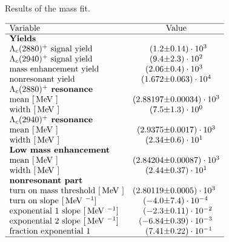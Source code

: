  
\begin{table}[h]
    \centering
    \caption{Results of the \Dz\proton mass fit.}
    \label{tab:fit_mD0p_RS}
    $\begin{array}{lr@{\pm}l}
    \hline
    \text{Variable} & \multicolumn{2}{c}{\text{Value}} \\
    \hline
        \multicolumn{3}{l}{\text{\textbf{Yields}}} \\
\text{\LcResI signal yield}&(1.2 & 0.14) \cdot 10^{3}\\
\text{\LcResII signal yield}&(9.4 & 2.3) \cdot 10^{2}\\
\text{mass enhancement yield}&(2.06 & 0.4) \cdot 10^{3}\\
\text{nonresonant yield}&(1.672 & 0.063) \cdot 10^{4}\\
\multicolumn{3}{l}{\text{\textbf{\LcResI resonance}}} \\
\text{mean [\mev]}&(2.88197 & 0.00034) \cdot 10^{3}\\
\text{width [\mev]}&(7.5 & 1.3) \cdot 10^{0}\\
\multicolumn{3}{l}{\text{\textbf{\LcResII resonance}}} \\
\text{mean [\mev]}&(2.9375 & 0.0017) \cdot 10^{3}\\
\text{width [\mev]}&(2.34 & 0.6) \cdot 10^{1}\\
\multicolumn{3}{l}{\text{\textbf{Low mass enhancement}}} \\
\text{mean [\mev]}&(2.84204 & 0.00087) \cdot 10^{3}\\
\text{width [\mev]}&(2.44 & 0.37) \cdot 10^{1}\\
\multicolumn{3}{l}{\text{\textbf{nonresonant part}}} \\
\text{turn on mass threshold [\mev]}&(2.80119 & 0.0005) \cdot 10^{3}\\
\text{turn on slope [\mev$^{-1}$]}&(-4.0 & 7.4) \cdot 10^{-4}\\
\text{exponential 1 slope [\mev$^{-1}$]}&(-2.3 & 0.11) \cdot 10^{-2}\\
\text{exponential 2 slope [\mev$^{-1}$]}&(-6.84 & 0.39) \cdot 10^{-3}\\
\text{fraction exponential 1}&(7.41 & 0.22) \cdot 10^{-1}\\

\hline
\end{array}$
\end{table}
    